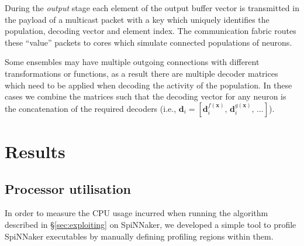 \documentclass[conference]{IEEEtran}
\renewcommand{\vec}{\mathbf}  %
\begin{document}
  During the \textit{output} stage each element of the output buffer vector is transmitted in the payload of a multicast packet with a key which uniquely identifies the population, decoding vector and element index.
  The communication fabric routes these ``value'' packets to cores which simulate connected populations of neurons.

  Some ensembles may have multiple outgoing connections with different transformations or functions, as a result there are multiple decoder matrices which need to be applied when decoding the activity of the population.
  In these cases we combine the matrices such that the decoding vector for any neuron is the concatenation of the required decoders
  (i.e., $\vec{d}_i = \left[\vec{d}_i^{f(\vec{x})},\,\vec{d}_i^{g(\vec{x})},\,\ldots \right]$).

  \section{Results}
  \label{sec:results}

  \subsection{Processor utilisation}
In order to measure the CPU usage incurred when running the algorithm described in \S\ref{sec:exploiting} on SpiNNaker, we developed a simple tool to profile SpiNNaker executables by manually defining profiling regions within them.
\end{document}
